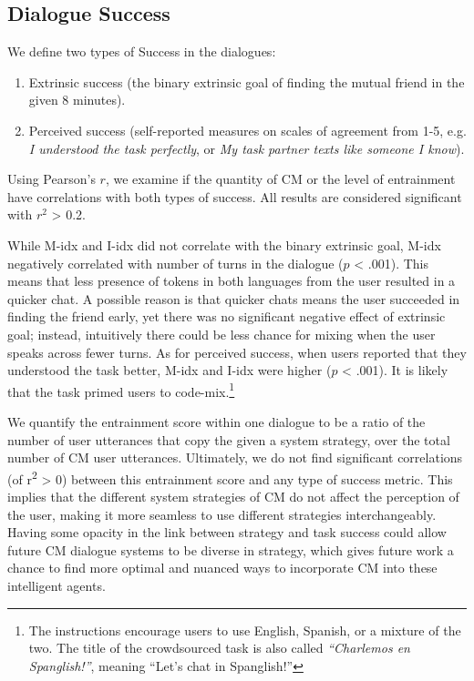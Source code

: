 \documentclass[11pt,a4paper]{article}
\begin{document}
\subsection{Dialogue Success}

We define two types of Success in the dialogues:

\begin{enumerate}
\item Extrinsic success (the binary extrinsic goal of finding the mutual friend in the given 8 minutes).
\item Perceived success (self-reported measures on scales of agreement from 1-5, e.g. \textit{I understood the task perfectly}, or \textit{My task partner texts like someone I know}).
\end{enumerate}

Using Pearson's $r$, we examine if the quantity of CM or the level of entrainment have correlations with both types of success.
All results are considered significant with $r^2$ > 0.2.

While M-idx and I-idx did not correlate with the binary extrinsic goal, M-idx negatively correlated with number of turns in the dialogue ($p$ < .001).
This means that less presence of tokens in both languages from the user resulted in a quicker chat.
A possible reason is that quicker chats means the user succeeded in finding the friend early, yet there was no significant negative effect of extrinsic goal; instead, intuitively there could be less chance for mixing when the user speaks across fewer turns.
As for perceived success, when users reported that they understood the task better, M-idx and I-idx were higher ($p$ < .001).
It is likely that the task primed users to code-mix.\footnote{The instructions encourage users to use English, Spanish, or a mixture of the two. The title of the crowdsourced task is also called \textit{``Charlemos en Spanglish!''}, meaning ``Let's chat in Spanglish!''}

We quantify the entrainment score within one dialogue to be a ratio of the number of user utterances that copy the given a system strategy, over the total number of CM user utterances. 
Ultimately, we do not find significant correlations (of r\textsuperscript{2} > 0) between this entrainment score and any type of success metric.
 This implies that the different system strategies of CM do not affect the perception of the user, making it more seamless to use different strategies interchangeably. 
Having some opacity in the link between strategy and task success could allow future CM dialogue systems to be diverse in strategy, which gives future work a chance to find more optimal and nuanced ways to incorporate CM into these intelligent agents.
\end{document}

